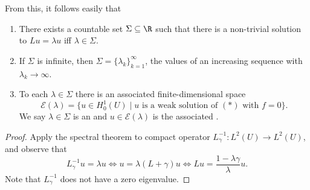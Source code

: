 \documentclass[a4paper]{article}
\begin{document}
From this, it follows easily that
\begin{thm}[Spectrum of $L$]\leavevmode
  \begin{enumerate}
    \item There exists a countable set $\Sigma \subseteq \R$ such that there is a non-trivial solution to $Lu = \lambda u$ iff $\lambda \in \Sigma$.
    \item If $\Sigma$ is infinite, then $\Sigma = \{\lambda_k\}_{k = 1}^\infty$, the values of an increasing sequence with $\lambda_k \to \infty$.
    \item To each $\lambda \in \Sigma$ there is an associated finite-dimensional space
      \[
        \mathcal{E}(\lambda) = \{u \in H_0^1(U) \mid u\text{ is a weak solution of }(*)\text{ with $f = 0$}\}.
      \]
      We say $\lambda \in \Sigma$ is an  and $u \in \mathcal{E}(\lambda)$ is the associated .
  \end{enumerate}
\end{thm}

\begin{proof}
  Apply the spectral theorem to compact operator $L_\gamma^{-1}: L^2(U) \to L^2(U)$, and observe that
  \[
    L_\gamma^{-1} u = \lambda u \Longleftrightarrow u = \lambda (L + \gamma) u \Longleftrightarrow Lu = \frac{1 - \lambda \gamma}{\lambda} u.
  \]
  Note that $L_\gamma^{-1}$ does not have a zero eigenvalue.
\end{proof}
\end{document}
